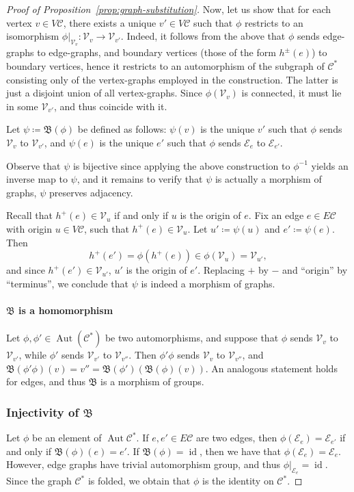 \documentclass[ALCO,ThmDefs,Unicode,epreuves]{cedram}
\newcommand{\cC}{\mathcal{C}}
\newcommand{\cV}{\mathcal{V}}
\newcommand{\cE}{\mathcal{E}}
\DeclareMathOperator{\aut}{Aut}
\DeclareMathOperator{\id}{id}
\newcommand{\Con}{\mathfrak{B}}
\begin{document}
\begin{proof}[Proof of Proposition~\ref{prop:graph-substitution}]
Now, let us show that for each vertex $v\in V\cC$, there exists a unique $v'\in V\cC$ such that ${\phi}$ restricts to an isomorphism ${\phi}|_{\cV_v}:\cV_v \to \cV_{v'}$. Indeed, it follows from the above that ${\phi}$ sends edge-graphs to edge-graphs, and boundary vertices (those of the form $h^{\pm}(e)$) to boundary vertices, hence it restricts to an automorphism of the subgraph of $\cC^*$ consisting only of the vertex-graphs employed in the construction. The latter is just a disjoint union of all vertex-graphs. Since ${\phi}(\cV_v)$ is connected, it must lie in some $\cV_{v'}$, and thus coincide with it.
 
Let $ {\psi} \coloneqq \Con({\phi})$ be defined as follows: ${\psi}(v)$ is the unique $v'$ such that ${\phi}$ sends $\cV_v$ to $\cV_{v'}$, and ${\psi}(e)$ is the unique $e'$ such that ${\phi}$ sends $\cE_e$ to $\cE_{e'}$.

Observe that ${\psi}$ is bijective since applying the above construction to ${\phi}^{-1}$ yields an inverse map to ${\psi}$, and it remains to verify that ${\psi}$ is actually a morphism of graphs, \ie $\psi$ preserves adjacency.

Recall that $h^{+}(e)\in \cV_u$ if and only if $u$ is the origin of $e$. Fix an edge $e\in E\cC$ with origin $u\in V\cC$, such that $h^{+}(e)\in \cV_u$. Let $u'\coloneqq {\psi}(u)$ and $e'\coloneqq {\psi}(e)$. Then
\[
h^{+}(e') = {\phi}(h^{+}(e)) \in {\phi}(\cV_u) = \cV_{u'},
\]
and since $h^{+}(e')\in \cV_{u'}$, $u'$ is the origin of $e'$. Replacing $+$ by $-$ and ``origin'' by ``terminus'', we conclude that ${\psi}$ is indeed a morphism of graphs.


\paragraph{$\Con$ is a homomorphism} Let ${\phi}, {\phi}'\in \aut(\cC^*)$ be two automorphisms, and suppose that ${\phi}$ sends $\cV_v$ to $\cV_{v'}$, while ${\phi}'$ sends $\cV_{v'}$ to $\cV_{v''}$. Then ${\phi}'{\phi}$ sends $\cV_{v}$ to $\cV_{v''}$, and $\Con({\phi}'{\phi})(v) = v'' = \Con({\phi}')(\Con({\phi})(v))$.
An analogous statement holds for edges, and thus $\Con$ is a morphism of groups.


\subsubsection*{Injectivity of $\Con$} Let $\phi$ be an element of $\aut \cC^{*}$. If $e, e' \in E \cC$ are two edges, then $\phi(\cE_e)=\cE_{e'}$ if and only if $\Con (\phi )(e)=e'$. If $\Con(\phi) = \id $, then we have that $\phi(\cE_e)=\cE_{e}$. However, edge graphs have trivial automorphism group, and thus $\phi|_{\cE_e}=\id $. Since the graph $\cC^*$ is folded, we obtain that $\phi$ is the identity on $\cC^*$.


\end{proof}
\end{document}
